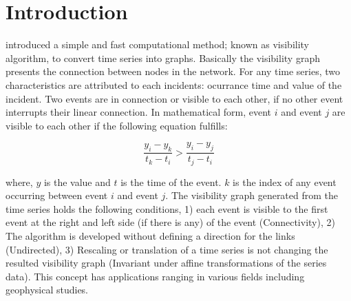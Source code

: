 
\section{Introduction}
\noindent
\citet{Lacasa2008} introduced a simple and fast computational method; known as visibility algorithm, to convert time series into graphs. Basically the visibility graph presents the connection between nodes in the network. For any time series, two characteristics are attributed to each incidents: ocurrance time and value of the incident. Two events are in connection or visible to each other, if no other event interrupts their linear connection. In mathematical form, event $i$ and event $j$ are visible to each other if the following equation fulfills:

\begin{equation}
\frac{y_i - y_k }{t_k - t_i} > \frac{y_i - y_j}{ t_j - t_i} 
\end{equation}

\noindent
where, $y$ is the value and $t$ is the time of the event. $k$ is the index of any event occurring between event $i$ and event $j$. The visibility graph generated from the time series holds the following conditions, 1) each event is visible to the first event at the right and left side (if there is any) of the event  (Connectivity), 2) The algorithm is developed without defining a direction for the links (Undirected),  3) Rescaling or translation of a time series is not changing the resulted visibility graph (Invariant under affine transformations of  the series data)\citep{Lacasa2008}. This concept has applications ranging in various fields including geophysical studies.


